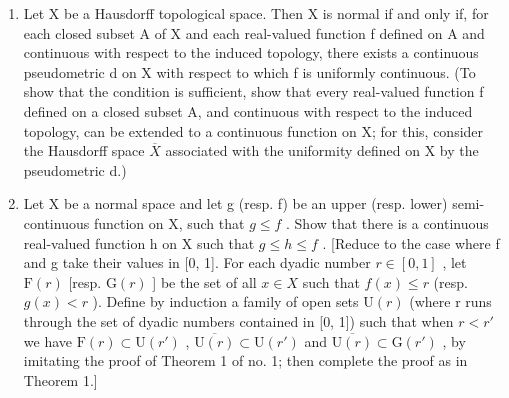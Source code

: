 \begin{enumerate}
\def\labelenumi{\arabic{enumi})}
\setcounter{enumi}{28}
\item
  Let X be a Hausdorff topological space. Then X is normal if and only if, for each closed subset A of X and each real-valued function f defined on A and continuous with respect to the induced topology, there exists a continuous pseudometric d on X with respect to which f is uniformly continuous. (To show that the condition is sufficient, show that every real-valued function f defined on a closed subset A, and continuous with respect to the induced topology, can be extended to a continuous function on X; for this, consider the Hausdorff space \(\overline{X}\) associated with the uniformity defined on X by the pseudometric d.)
\item
  Let X be a normal space and let g (resp. f) be an upper (resp. lower) semi-continuous function on X, such that \(g \leqslant f\) . Show that there is a continuous real-valued function h on X such that \(g \leqslant h \leqslant f\) . {[}Reduce to the case where f and g take their values in {[}0, 1{]}. For each dyadic number \(r \in [0, 1]\) , let \(\mathrm{F}(r)\) {[}resp. \(\mathrm{G}(r)\) {]} be the set of all \(x \in X\) such that \(f(x) \leqslant r\) (resp. \(g(x) < r\) ). Define by induction a family of open sets \(\mathrm{U}(r)\) (where r runs through the set of dyadic numbers contained in {[}0, 1{]}) such that when \(r < r'\) we have \(\mathrm{F}(r) \subset \mathrm{U}(r')\) , \(\overline{\mathrm{U}(r)} \subset \mathrm{U}(r')\) and \(\overline{\mathrm{U}(r)} \subset \mathrm{G}(r')\) , by imitating the proof of Theorem 1 of no. 1; then complete the proof as in Theorem 1.{]}
\end{enumerate}
